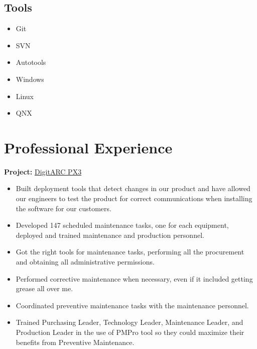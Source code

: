 \documentclass{scrartcl}
\begin{document}
\begin{minipage}[t]{0.28\textwidth}
\begin{flushright}
	
	\section*{Tools}
		\begin{itemize}[noitemsep]
			\item Git
			\item SVN
			\item Autotools
			\item Windows
			\item Linux 
			\item QNX
		\end{itemize}
	\end{flushright}
\end{minipage}

\pagebreak
\section*{Professional Experience}


\textbf{Project:} \href{http://amige.com/meltshops_technological_controls_digitarc_px3.html}{DigitARC PX3}
	\begin{itemize}[noitemsep]
		\item Built deployment tools that detect changes in our product and have allowed our engineers to test the product for correct communications when installing the software for our customers.
	\end{itemize}


\begin{itemize}[noitemsep]
	\item Developed 147 scheduled maintenance tasks, one for each equipment, deployed and trained maintenance and production personnel.  
	\item Got the right tools for maintenance tasks, performing all the procurement and obtaining all administrative permissions.
	\item Performed corrective maintenance when necessary, even if it included getting grease all over me. 
	\item Coordinated preventive maintenance tasks with the maintenance personnel.
	\item Trained Purchasing Leader, Technology Leader, Maintenance Leader, and Production Leader in the use of PMPro tool so they could maximize their benefits from Preventive Maintenance.  
\end{itemize}
\end{document}
